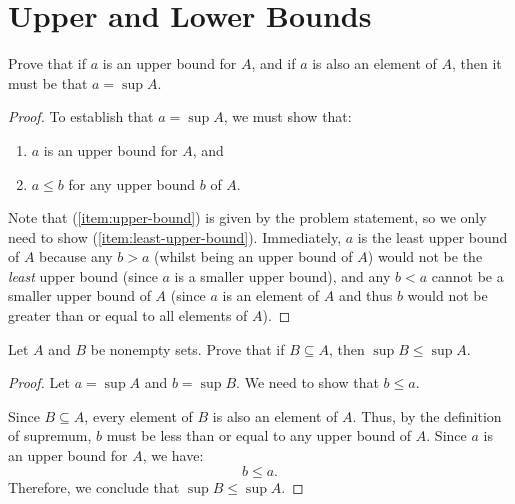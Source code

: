 \section{Upper and Lower Bounds}

\begin{problem}\label{prob:bounded-convergent}
  Prove that if $a$ is an upper bound for $A$, and if $a$ is also an element of $A$, 
  then it must be that $a = \sup{A}$.
\end{problem}

\begin{proof}
  To establish that $a = \sup{A}$, we must show that:
  \begin{enumerate}
    \item $a$ is an upper bound for $A$, and \label{item:upper-bound}
    \item $a \leq b$ for any upper bound $b$ of $A$. \label{item:least-upper-bound}
  \end{enumerate}

  Note that (\ref{item:upper-bound}) is given by the problem statement, so we
  only need to show (\ref{item:least-upper-bound}). Immediately, $a$ is the
  least upper bound of $A$ because any $b > a$ (whilst being an upper bound of
  $A$) would not be the \textit{least} upper bound (since $a$ is a smaller upper
  bound), and any $b < a$ cannot be a smaller upper bound of $A$ (since $a$ is an
  element of $A$ and thus $b$ would not be greater than or equal to all
  elements of $A$).
\end{proof}


\begin{problem}\label{prob:sup-subset}
  Let $A$ and $B$ be nonempty sets. Prove that if $B \subseteq A$, then
  $\sup{B} \leq \sup{A}$.
\end{problem}

\begin{proof}
  Let $a = \sup{A}$ and $b = \sup{B}$. We need to show that $b \leq a$.

  Since $B \subseteq A$, every element of $B$ is also an element of $A$. Thus,
  by the definition of supremum, $b$ must be less than or equal to any upper
  bound of $A$. Since $a$ is an upper bound for $A$, we have:
  \[
    b \leq a.
  \]
  Therefore, we conclude that $\sup{B} \leq \sup{A}$.
\end{proof}


